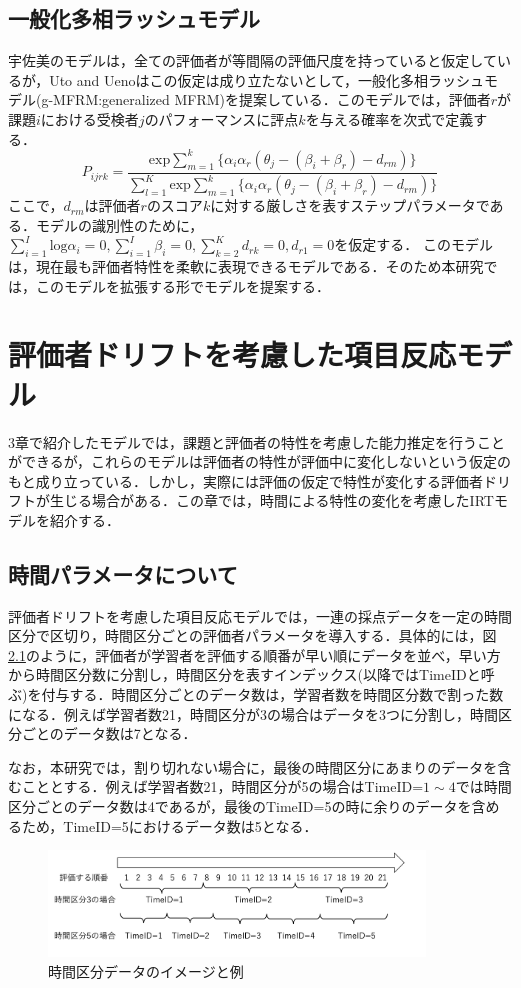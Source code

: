 \documentclass[a4paper,11pt,oneside,openany]{jsbook}
\begin{document}
\section{一般化多相ラッシュモデル}
宇佐美のモデルは，全ての評価者が等間隔の評価尺度を持っていると仮定しているが，Uto and Ueno\cite{g-MFRM}はこの仮定は成り立たないとして，一般化多相ラッシュモデル(g-MFRM:generalized MFRM)を提案している．このモデルでは，評価者$r$が課題$i$における受検者$j$のパフォーマンスに評点$k$を与える確率を次式で定義する．
\begin{displaymath}
  P_{ijrk}=\frac{\mathrm{exp}\sum_{m=1}^{k}\{\alpha_i\alpha_r(\theta_{j}-(\beta_{i}+\beta_{r})-d_{rm})\}}{\sum_{l=1}^{K}\mathrm{exp}\sum_{m=1}^{k}\{\alpha_i\alpha_r(\theta_{j}-(\beta_{i}+\beta_{r})-d_{rm})\}}
\end{displaymath}
ここで，$d_{rm}$は評価者$r$のスコア$k$に対する厳しさを表すステップパラメータである．モデルの識別性のために，$\sum^{I}_{i=1}{\mathrm{log}\alpha_i}=0,\sum^{I}_{i=1}{\beta_i}=0,\sum^{K}_{k=2}{d_{rk}}=0, d_{r1}=0$を仮定する．
このモデルは，現在最も評価者特性を柔軟に表現できるモデルである．そのため本研究では，このモデルを拡張する形でモデルを提案する．

\chapter{評価者ドリフトを考慮した項目反応モデル}
3章で紹介したモデルでは，課題と評価者の特性を考慮した能力推定を行うことができるが，これらのモデルは評価者の特性が評価中に変化しないという仮定のもと成り立っている．しかし，実際には評価の仮定で特性が変化する評価者ドリフトが生じる場合がある．この章では，時間による特性の変化を考慮したIRTモデルを紹介する．

\section{時間パラメータについて}
評価者ドリフトを考慮した項目反応モデルでは，一連の採点データを一定の時間区分で区切り，時間区分ごとの評価者パラメータを導入する．具体的には，図\ref{timeid}のように，評価者が学習者を評価する順番が早い順にデータを並べ，早い方から時間区分数に分割し，時間区分を表すインデックス(以降ではTimeIDと呼ぶ)を付与する．時間区分ごとのデータ数は，学習者数を時間区分数で割った数になる．例えば学習者数21，時間区分が3の場合はデータを3つに分割し，時間区分ごとのデータ数は7となる．

なお，本研究では，割り切れない場合に，最後の時間区分にあまりのデータを含むこととする．例えば学習者数21，時間区分が5の場合はTimeID=$1\sim4$では時間区分ごとのデータ数は4であるが，最後のTimeID=5の時に余りのデータを含めるため，TimeID=5におけるデータ数は5となる．
\begin{figure}[ht]
 \centering
\includegraphics[width=10cm]{img/timeid.png}
\caption{時間区分データのイメージと例}
 \label{timeid}
\end{figure}
\end{document}
